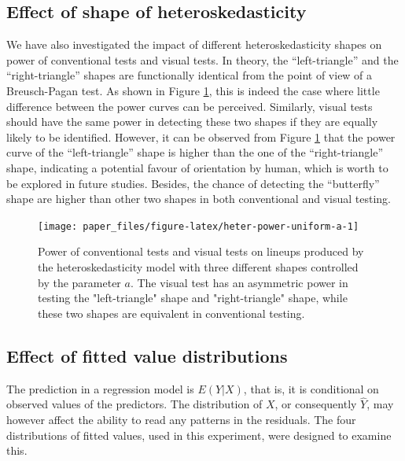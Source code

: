 \documentclass[]{interact}
\theoremstyle{plain}%
\theoremstyle{definition}
\theoremstyle{remark}
\begin{document}
\hypertarget{effect-of-shape-of-heteroskedasticity}{%
\subsection{Effect of shape of
heteroskedasticity}\label{effect-of-shape-of-heteroskedasticity}}

We have also investigated the impact of different heteroskedasticity
shapes on power of conventional tests and visual tests. In theory, the
``left-triangle'' and the ``right-triangle'' shapes are functionally
identical from the point of view of a Breusch-Pagan test. As shown in
Figure \ref{fig:heter-power-uniform-a}, this is indeed the case where
little difference between the power curves can be perceived. Similarly,
visual tests should have the same power in detecting these two shapes if
they are equally likely to be identified. However, it can be observed
from Figure \ref{fig:heter-power-uniform-a} that the power curve of the
``left-triangle'' shape is higher than the one of the ``right-triangle''
shape, indicating a potential favour of orientation by human, which is
worth to be explored in future studies. Besides, the chance of detecting
the ``butterfly'' shape are higher than other two shapes in both
conventional and visual testing.

\begin{figure}

{\centering \texttt{[image: paper\_files/figure-latex/heter-power-uniform-a-1]} 

}

\caption{Power of conventional tests and visual tests on lineups produced by the heteroskedasticity model with three different shapes controlled by the parameter $a$. The visual test has an asymmetric power in testing the "left-triangle" shape and "right-triangle" shape, while these two shapes are equivalent in conventional testing.}\label{fig:heter-power-uniform-a}
\end{figure}

\hypertarget{effect-of-fitted-value-distributions}{%
\subsection{Effect of fitted value
distributions}\label{effect-of-fitted-value-distributions}}

The prediction in a regression model is \(E(Y|X)\), that is, it is
conditional on observed values of the predictors. The distribution of
\(X\), or consequently \(\hat{Y}\), may however affect the ability to
read any patterns in the residuals. The four distributions of fitted
values, used in this experiment, were designed to examine this.
\end{document}
